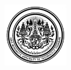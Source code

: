 \documentclass[12pt,oneside,openright,a4paper]{cpe-english-project}
\begin{document}
\pdfstringdefDisableCommands{%
\let\MakeUppercase\relax
}
\begin{center}
  \includegraphics[width=2.8cm]{logo02.png}
\end{center}
\vspace*{-1cm}

\maketitlepage
\makesignaturepage 

%
%
%
%
%
%
%

\tableofcontents                    
\listoftables
\listoffigures                      
\end{document}
